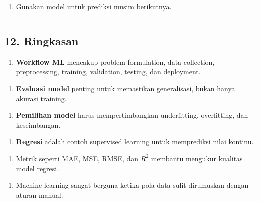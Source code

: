 \documentclass[12pt,a4paper]{article}
\begin{document}
\begin{enumerate}
\item Gunakan model untuk prediksi musim berikutnya.
\end{enumerate}


\hrule


\subsection{12. Ringkasan}

\begin{enumerate}
\item \textbf{Workflow ML} mencakup problem formulation, data collection, preprocessing, training, validation, testing, dan deployment.
\end{enumerate}

\begin{enumerate}
\item \textbf{Evaluasi model} penting untuk memastikan generalisasi, bukan hanya akurasi training.
\end{enumerate}

\begin{enumerate}
\item \textbf{Pemilihan model} harus mempertimbangkan underfitting, overfitting, dan keseimbangan.
\end{enumerate}

\begin{enumerate}
\item \textbf{Regresi} adalah contoh supervised learning untuk memprediksi nilai kontinu.
\end{enumerate}

\begin{enumerate}
\item Metrik seperti MAE, MSE, RMSE, dan $R^2$ membantu mengukur kualitas model regresi.
\end{enumerate}

\begin{enumerate}
\item Machine learning sangat berguna ketika pola data sulit dirumuskan dengan aturan manual.
\end{enumerate}
\end{document}
